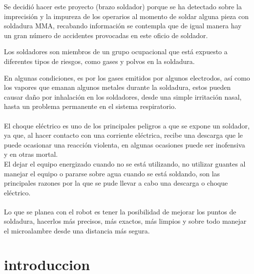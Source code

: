 \documentclass[12pt,letterpaper]{article}
\begin{document}
\begin{flushleft}
Se decidió hacer este proyecto (brazo soldador) porque se ha detectado sobre la imprecisión y la impureza de los operarios al momento de soldar alguna pieza con soldadura MMA, recabando información se contempla que de igual manera hay un gran número de accidentes provocadas en este oficio de soldador.
\end{flushleft}

\begin{flushleft}
Los soldadores son miembros de un grupo ocupacional que está expuesto a diferentes tipos de riesgos, como gases y polvos en la soldadura. 
\end{flushleft}
En algunas condiciones, es por los gases emitidos por algunos electrodos, así como los vapores que emanan algunos metales durante la soldadura, estos pueden causar daño por inhalación en los soldadores, desde una simple irritación nasal, hasta un problema permanente en el sistema respiratorio.
\\\\
El choque eléctrico es uno de los principales peligros a que se expone un soldador, ya que, al hacer contacto con una corriente eléctrica, recibe una descarga que le puede ocasionar una reacción violenta, en algunas ocasiones puede ser inofensiva y en otras mortal.
\\
El dejar el equipo energizado cuando no se está utilizando, no utilizar guantes al manejar el equipo o pararse sobre agua cuando se está soldando, son las principales razones por la que se pude llevar a cabo una descarga o choque eléctrico.
\\\\
Lo que se planea con el robot es tener la posibilidad de mejorar los puntos de soldadura, hacerlos más precisos, más exactos, más limpios y sobre todo manejar el microalambre desde una distancia más segura.

\newpage




\section*{introduccion}
\end{document}
